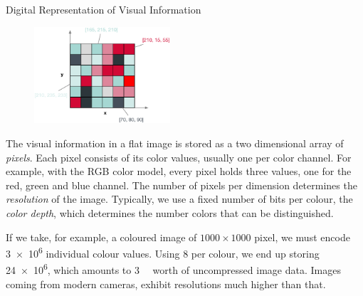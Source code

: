 \begin{example}[label=example:representation_visual_information]{Digital Representation of Visual Information}{}
    \begin{figure}
        \includegraphics[width=0.45\textwidth]{figures/example-visual-signal.eps}
    \end{figure}
    The visual information in a flat image is stored as a two dimensional array of \emph{pixels}. Each pixel consists of its color values, usually one per color channel. For example, with the RGB color model, every pixel holds three values, one for the red, green and blue channel. The number of pixels per dimension determines the \emph{resolution} of the image. Typically, we use a fixed number of bits per colour, the \emph{color depth}, which determines the number colors that can be distinguished.

    If we take, for example, a coloured image of $1000 \times 1000$ pixel, we must encode \num{3e6} individual colour values. Using \SI{8}{\bit} per colour, we end up storing \SI{24e6}{\bit}, which amounts to \SI{3}{\mega\byte} worth of uncompressed image data. Images coming from modern cameras, exhibit resolutions much higher than that.
\end{example}

